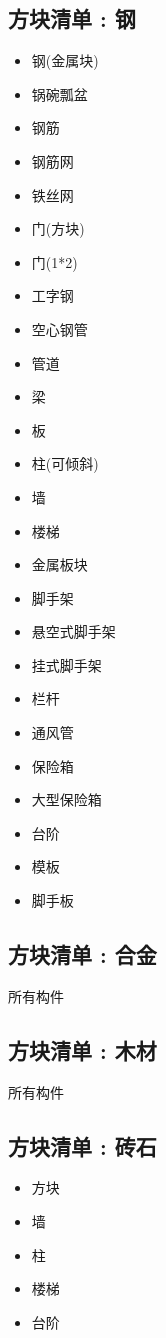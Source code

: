 {  \subsection{方块清单 : 钢}{
      \begin{itemize}
          \item 钢(金属块)
          \item 锅碗瓢盆
          \item 钢筋
          \item 钢筋网
          \item 铁丝网
          \item 门(方块)
          \item 门(1*2)
          \item 工字钢
          \item 空心钢管
          \item 管道
          \item 梁
          \item 板
          \item 柱(可倾斜)
          \item 墙
          \item 楼梯
          \item 金属板块
          \item 脚手架
          \item 悬空式脚手架
          \item 挂式脚手架
          \item 栏杆
          \item 通风管
          \item 保险箱
          \item 大型保险箱
          \item 台阶
          \item 模板
          \item 脚手板
      \end{itemize}
  }

  \subsection{方块清单 : 合金}{
      所有构件
  }

  \subsection{方块清单 : 木材}{
      所有构件
  }

  \subsection{方块清单 : 砖石}{
      \begin{itemize}
          \item 方块
          \item 墙
          \item 柱
          \item 楼梯
          \item 台阶
      \end{itemize}

}}
